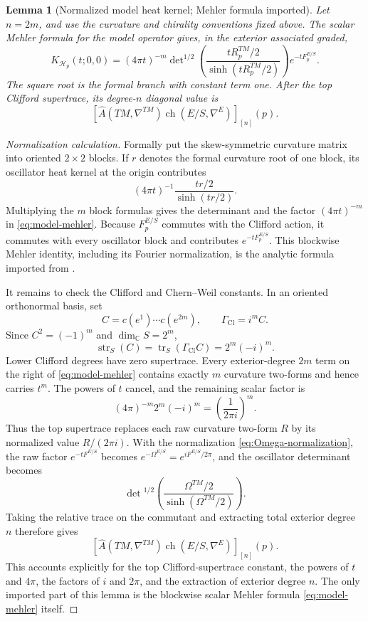 \documentclass[11pt,oneside,reqno]{book}
\DeclareMathOperator{\Cl}{Cl}
\newcommand{\Ahat}{\widehat A}
\theoremstyle{plain}
\newtheorem{lemma}[theorem]{Lemma}
\theoremstyle{definition}
\theoremstyle{remark}
\begin{document}
\begin{lemma}[Normalized model heat kernel; Mehler formula imported]\label{lem:model}
Let \(n=2m\), and use the curvature and chirality conventions fixed above.
The scalar Mehler formula for the model operator gives, in the exterior
associated graded,
\begin{equation}\label{eq:model-mehler}
 K_{\mathcal H_p}(t;0,0)
 =
 (4\pi t)^{-m}
 \det\nolimits^{1/2}
 \left(
  \frac{tR^{TM}_p/2}{\sinh(tR^{TM}_p/2)}
 \right)
 e^{-tF^{E/S}_p}.
\end{equation}
The square root is the formal branch with constant term one.  After the top
Clifford supertrace, its degree-\(n\) diagonal value is
\[
 \left[
 \Ahat(TM,\nabla^{TM})
 \operatorname{ch}(E/S,\nabla^E)
 \right]_{[n]}(p).
\]
\end{lemma}

\begin{proof}[Normalization calculation]
Formally put the skew-symmetric curvature matrix into oriented
\(2\times2\) blocks.  If \(r\) denotes the formal curvature root of one
block, its oscillator heat kernel at the origin contributes
\[
 (4\pi t)^{-1}\frac{tr/2}{\sinh(tr/2)}.
\]
Multiplying the \(m\) block formulas gives the determinant and the factor
\((4\pi t)^{-m}\) in \eqref{eq:model-mehler}.  Because
\(F^{E/S}_p\) commutes with the Clifford action, it commutes with every
oscillator block and contributes \(e^{-tF^{E/S}_p}\).  This blockwise
Mehler identity, including its Fourier normalization, is the analytic
formula imported from \cite[Chapter~4]{BGV}.

It remains to check the Clifford and Chern--Weil constants.  In an oriented
orthonormal basis, set
\[
 C=c(e^1)\cdots c(e^{2m}),
 \qquad
 \Gamma_{\Cl}=i^mC.
\]
Since \(C^2=(-1)^m\) and \(\dim_\mathbb C S=2^m\),
\begin{equation}\label{eq:top-clifford-supertrace}
 \operatorname{str}_S(C)
 =\operatorname{tr}_S(\Gamma_{\Cl}C)
 =2^m(-i)^m.
\end{equation}
Lower Clifford degrees have zero supertrace.  Every exterior-degree
\(2m\) term on the right of \eqref{eq:model-mehler} contains exactly \(m\)
curvature two-forms and hence carries \(t^m\).  The powers of \(t\) cancel,
and the remaining scalar factor is
\[
 (4\pi)^{-m}2^m(-i)^m
 =\left(\frac{1}{2\pi i}\right)^m.
\]
Thus the top supertrace replaces each raw curvature two-form \(R\) by its
normalized value \(R/(2\pi i)\).  With the normalization
\eqref{eq:Omega-normalization}, the raw factor \(e^{-tF^{E/S}}\) becomes
\(e^{-\Omega^{E/S}}=e^{iF^{E/S}/2\pi}\), and the oscillator determinant
becomes
\[
 \det{}^{1/2}\!\left(
   \frac{\Omega^{TM}/2}{\sinh(\Omega^{TM}/2)}
 \right).
\]
Taking the relative trace on the commutant and extracting total exterior
degree \(n\) therefore gives
\[
 \left[
 \Ahat(TM,\nabla^{TM})
 \operatorname{ch}(E/S,\nabla^E)
 \right]_{[n]}(p).
\]
This accounts explicitly for the top Clifford-supertrace constant, the
powers of \(t\) and \(4\pi\), the factors of \(i\) and \(2\pi\), and the
extraction of exterior degree \(n\).  The only imported part of this lemma
is the blockwise scalar Mehler formula \eqref{eq:model-mehler} itself.
\end{proof}
\end{document}
